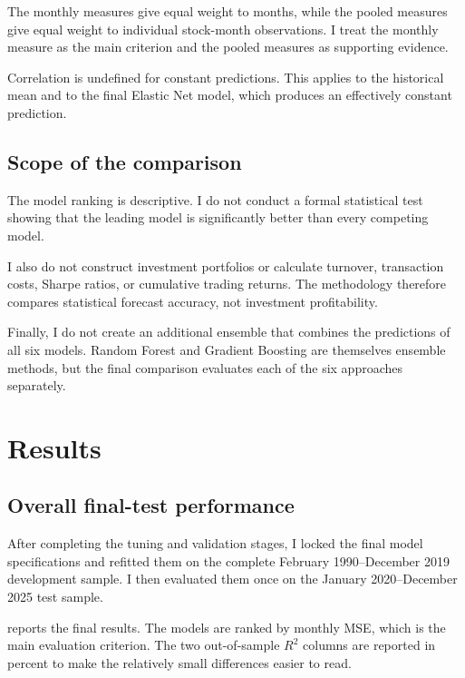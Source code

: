 \documentclass[11pt,a4paper]{article}
\begin{document}
The monthly measures give equal weight to months, while the pooled measures
give equal weight to individual stock-month observations. I treat the monthly
measure as the main criterion and the pooled measures as supporting evidence.

Correlation is undefined for constant predictions. This applies to the
historical mean and to the final Elastic Net model, which produces an
effectively constant prediction.

\subsection{Scope of the comparison}

The model ranking is descriptive. I do not conduct a formal statistical test
showing that the leading model is significantly better than every competing
model.

I also do not construct investment portfolios or calculate turnover,
transaction costs, Sharpe ratios, or cumulative trading returns. The
methodology therefore compares statistical forecast accuracy, not investment
profitability.

Finally, I do not create an additional ensemble that combines the predictions
of all six models. Random Forest and Gradient Boosting are themselves ensemble
methods, but the final comparison evaluates each of the six approaches
separately.


\section{Results}
\label{sec:results}

\subsection{Overall final-test performance}

After completing the tuning and validation stages, I locked the final model
specifications and refitted them on the complete February 1990--December 2019
development sample. I then evaluated them once on the January 2020--December
2025 test sample.

 reports the final results. The models are ranked by
monthly MSE, which is the main evaluation criterion. The two out-of-sample
\(R^2\) columns are reported in percent to make the relatively small
differences easier to read.
\end{document}
